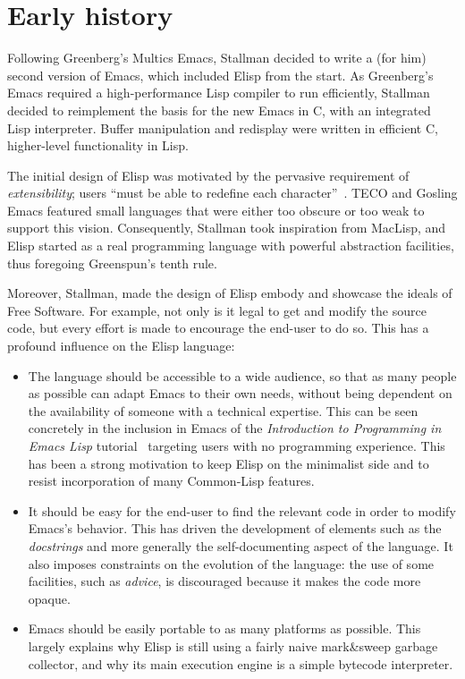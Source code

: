 \documentclass[format=acmsmall, review=false, screen=true]{acmart}
\newcommand \Elisp {Elisp}
\begin{document}
\section{Early history}         %
\label{sec:early-history}

Following Greenberg's Multics Emacs, Stallman decided to write a (for
him) second version of Emacs, which included \Elisp{} from the start.
As Greenberg's Emacs required a high-performance Lisp compiler to run
efficiently, Stallman decided to reimplement the basis for the new
Emacs in C, with an integrated Lisp interpreter.  Buffer manipulation
and redisplay were written in efficient C, higher-level functionality
in Lisp.

The initial design of \Elisp{} was motivated by the pervasive
requirement of \emph{extensibility}; users ``must be able to
redefine each character''~\cite{Stallman1981}.  TECO and Gosling Emacs
featured small languages that were either too obscure or too weak to
support this vision.  Consequently, Stallman took inspiration from
MacLisp, and \Elisp{} started as a real programming language with
powerful abstraction facilities, thus foregoing Greenspun's tenth
rule.

Moreover, Stallman, made the design of \Elisp{}
embody and showcase the ideals of Free Software.  For example, not only
is it legal to get and modify the source code, but every effort
is made to encourage the end-user to do so.  This has a profound
influence on the \Elisp{} language:
\begin{itemize}
\item The language should be accessible to a wide audience, so that as many
  people as possible can adapt Emacs to their own needs, without being
  dependent on the availability of someone with a technical expertise.
  This can be seen concretely in the inclusion in Emacs of the
  \emph{Introduction to Programming in Emacs Lisp}
  tutorial~\citep{ElispIntro} targeting users with no programming
  experience.  This has been a strong motivation to keep \Elisp{} on the
  minimalist side and to resist incorporation of many Common-Lisp features.
\item It should be easy for the end-user to find the relevant code in order
  to modify Emacs's behavior.  This has driven the development of elements
  such as the \emph{docstrings} and more generally the self-documenting
  aspect of the language.  It also imposes constraints on the evolution of
  the language: the use of some facilities, such as \emph{advice}, is
  discouraged because it makes the code more opaque.
\item Emacs should be easily portable to as many platforms as possible.
  This largely explains why \Elisp{} is still using a fairly naive
  mark\&sweep garbage collector, and why its main execution engine is
  a simple bytecode interpreter.
\end{itemize}
\end{document}

